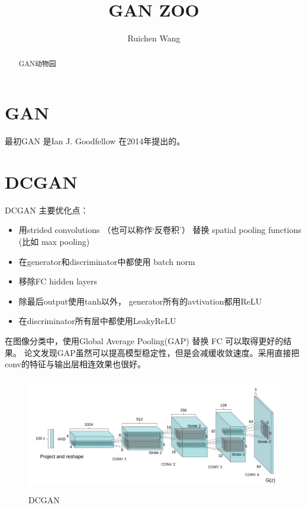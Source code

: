 \documentclass{article}
\title{GAN ZOO}
\author{Ruichen Wang}
\begin{document}
\begin{CJK*}{UTF8}{gbsn}
\maketitle
\begin{abstract}
GAN动物园
\end{abstract}

\tableofcontents
\section{GAN}
最初GAN\cite{DBLP:conf/nips/GoodfellowPMXWOCB14} 是Ian J. Goodfellow 在2014年提出的。
\section{DCGAN}
\noindent
DCGAN \cite{journals/corr/RadfordMC15} 主要优化点： \\
\begin{itemize}
\item 用strided convolutions （也可以称作‘反卷积’） 替换 spatial pooling functions (比如 max pooling)
\item 在generator和discriminator中都使用 batch norm
\item 移除FC hidden layers
\item 除最后output使用tanh以外， generator所有的avtivation都用ReLU
\item 在discriminator所有层中都使用LeakyReLU
\end{itemize}

在图像分类中，使用Global Average Pooling(GAP) 替换 FC 可以取得更好的结果。 论文发现GAP虽然可以提高模型稳定性，但是会减缓收敛速度。采用直接把conv的特征与输出层相连效果也很好。

\begin{figure}[H]
\centering
\includegraphics[width=5in,height=2in]{DCGAN}
\caption{DCGAN}
\end{figure}




\end{CJK*}
\end{document}
